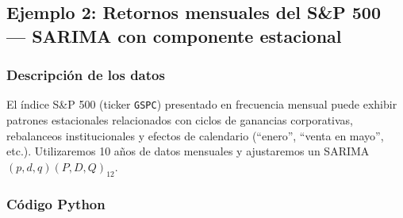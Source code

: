 \documentclass[12pt,a4paper]{article}
\begin{document}
\subsection{Ejemplo 2: Retornos mensuales del S\&P 500 --- SARIMA con componente estacional}

\subsubsection{Descripción de los datos}

El índice S\&P 500 (ticker \texttt{GSPC}) presentado en frecuencia mensual puede exhibir
patrones estacionales relacionados con ciclos de ganancias corporativas, rebalanceos
institucionales y efectos de calendario (``enero'', ``venta en mayo'', etc.). Utilizaremos
10 años de datos mensuales y ajustaremos un SARIMA$(p,d,q)(P,D,Q)_{12}$.

\subsubsection{Código Python}
\end{document}
